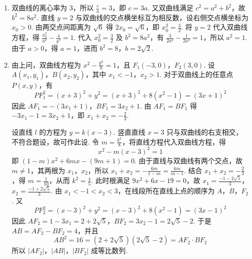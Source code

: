 \begin{solution}
\begin{enumerate}
\item 双曲线的离心率为 \(3\)，所以 \(\frac{c}{a}=3\)，即 \(c=3a\).
又双曲线满足 \(c^2=a^2+b^2\)，故 \(b^2=8a^2\).
直线 \(y=2\) 与双曲线的交点横坐标互为相反数，设右侧交点横坐标为 \(x_0>0\).
由两交点间距离为 \(\sqrt{6}\) 得 \(2x_0=\sqrt{6}\)，即 \(x_0^2=\frac{3}{2}\).
将 \(y=2\) 代入双曲线方程，得 \(\frac{x_0^2}{a^2}-\frac{4}{b^2}=1\).
代入 \(x_0^2=\frac{3}{2}\) 及 \(b^2=8a^2\)，有 \(\frac{3}{2a^2}-\frac{1}{2a^2}=1\)，所以 \(a^2=1\).
由于 \(a>0\)，得 \(a=1\)，进而 \(b^2=8\)，\(b=2\sqrt{2}\).

\item 由上问，双曲线方程为 \(x^2-\frac{y^2}{8}=1\)，且 \(F_1(-3,0)\)，\(F_2(3,0)\).
设 \(A(x_1,y_1)\)，\(B(x_2,y_2)\)，其中 \(x_1<-1\)，\(x_2>1\).
对于双曲线上的任意点 \(P(x,y)\)，有
\[
PF_1^2=(x+3)^2+y^2=(x+3)^2+8(x^2-1)=(3x+1)^2
\]
因此 \(AF_1=-(3x_1+1)\)，\(BF_1=3x_2+1\).
由 \(AF_1=BF_1\) 得 \(-3x_1-1=3x_2+1\)，即 \(x_1+x_2=-\frac{2}{3}\).

设直线 \(l\) 的方程为 \(y=k(x-3)\).
竖直直线 \(x=3\) 只与双曲线的右支相交，不符合题设，故可作此设.
令 \(m=\frac{k^2}{8}\)，将直线方程代入双曲线方程，得
\[
x^2-m(x-3)^2=1
\]
即 \((1-m)x^2+6mx-(9m+1)=0\).
由于直线与双曲线有两个交点，故 \(m\ne1\)，其两根为 \(x_1\)，\(x_2\)，所以
\(x_1+x_2=-\frac{6m}{1-m}=\frac{6m}{m-1}\).
结合 \(x_1+x_2=-\frac{2}{3}\)，得 \(m=\frac{1}{10}\)，从而 \(k^2=\frac{4}{5}\).
此时根满足 \(9x^2+6x-19=0\)，故
\(x_1=\frac{-1-2\sqrt{5}}{3}\)，\(x_2=\frac{-1+2\sqrt{5}}{3}\).
由 \(x_1<-1<x_2<3\)，在线段所在直线上点的顺序为 \(A\)，\(B\)，\(F_2\).
又
\[
PF_2^2=(x-3)^2+y^2=(x-3)^2+8(x^2-1)=(3x-1)^2
\]
因此
\(AF_2=1-3x_1=2+2\sqrt{5}\)，\(BF_2=3x_2-1=2\sqrt{5}-2\).
于是 \(AB=AF_2-BF_2=4\)，并且
\[
AB^2=16=(2+2\sqrt{5})(2\sqrt{5}-2)=AF_2\cdot BF_2
\]
所以 \(|AF_2|\)，\(|AB|\)，\(|BF_2|\) 成等比数列.
\end{enumerate}
\end{solution}
